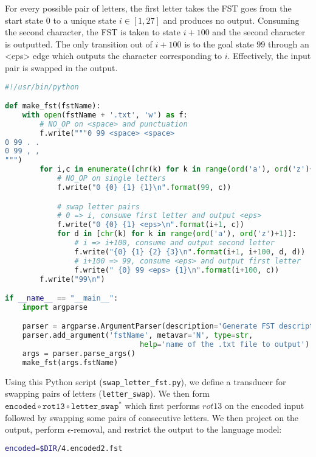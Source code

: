 \documentclass[a4paper,oneside,reqno]{amsart}
\begin{document}
\begin{enumerate}[label=\arabic*.]
\begin{enumerate}[label=(\alph*)]
    For every possible pair of letters, the first letter takes the FST goes
    from the start state $0$ to a unique state $i \in [1,27]$ and produces no
    output.  Consuming the second character, the FST is taken to state $i+100$
    and the second character is outputted. The only transition out of $i+100$
    is to the goal state $99$ through an <eps> edge which outputs the character
    corresponding to $i$. Effectively, the input pair is swapped in the output.
    \begin{lstlisting}[language=python]
#!/usr/bin/python

def make_fst(fstName):
    with open(fstName + '.txt', 'w') as f:
        # NO_OP on <space> and punctuation
        f.write("""0 99 <space> <space>
0 99 . .
0 99 , ,
""")
        for i,c in enumerate([chr(k) for k in range(ord('a'), ord('z')+1)]):
            # NO_OP on single letters
            f.write("0 {0} {1} {1}\n".format(99, c))

            # swap letter pairs
            # 0 => i, consume first letter and output <eps>
            f.write("0 {0} {1} <eps>\n".format(i+1, c))
            for d in [chr(k) for k in range(ord('a'), ord('z')+1)]:
                # i => i+100, consume and output second letter
                f.write("{0} {1} {2} {3}\n".format(i+1, i+100, d, d))
                # i+100 => 99, consume <eps> and output first letter
                f.write(" {0} 99 <eps> {1}\n".format(i+100, c))
        f.write("99\n")

if __name__ == "__main__":
    import argparse

    parser = argparse.ArgumentParser(description='Generate FST description for swapping letters')
    parser.add_argument('fstName', metavar='N', type=str,
                               help='name of the .txt file to output')
    args = parser.parse_args()
    make_fst(args.fstName)
    \end{lstlisting}

    Using this Python script (\texttt{swap\_letter\_fst.py}), we define a
    transducer for swapping pairs of letters (\texttt{letter\_swap}). We then
    form $\texttt{encoded} \circ \texttt{rot13} \circ \texttt{letter\_swap}^*$
    which first performs $rot13$ on the encoded input followed by swapping some
    pairs of consecutive letters. We then project on the output, perform
    $\epsilon$-removal, and restrict the output to the language model:
    \begin{lstlisting}[language=bash]
encoded=$DIR/4.encoded2.fst


\end{lstlisting}
\end{enumerate}
\end{enumerate}
\end{document}
